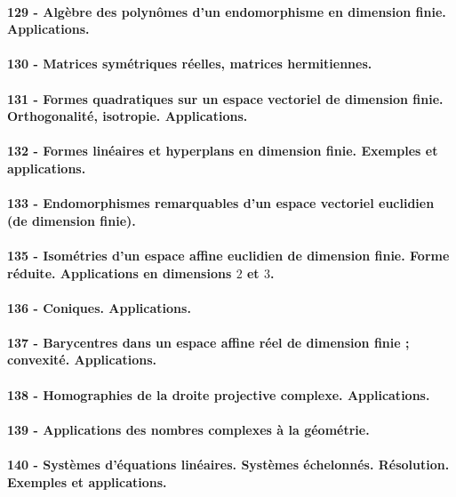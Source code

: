 \paragraph{129 - Algèbre des polynômes d’un endomorphisme en dimension finie. Applications.}
\paragraph{130 - Matrices symétriques réelles, matrices hermitiennes.}
\paragraph{131 - Formes quadratiques sur un espace vectoriel de dimension finie. Orthogonalité, isotropie. Applications.}
\paragraph{132 - Formes linéaires et hyperplans en dimension finie. Exemples et applications.}
\paragraph{133 - Endomorphismes remarquables d’un espace vectoriel euclidien (de dimension finie).}
\paragraph{135 - Isométries d’un espace affine euclidien de dimension finie. Forme réduite. Applications en dimensions $2$ et $3$.}
\paragraph{136 - Coniques. Applications.}
\paragraph{137 - Barycentres dans un espace affine réel de dimension finie ; convexité. Applications.}
\paragraph{138 - Homographies de la droite projective complexe. Applications.}
\paragraph{139 - Applications des nombres complexes à la géométrie.}
\paragraph{140 - Systèmes d’équations linéaires. Systèmes échelonnés. Résolution. Exemples et applications.}
